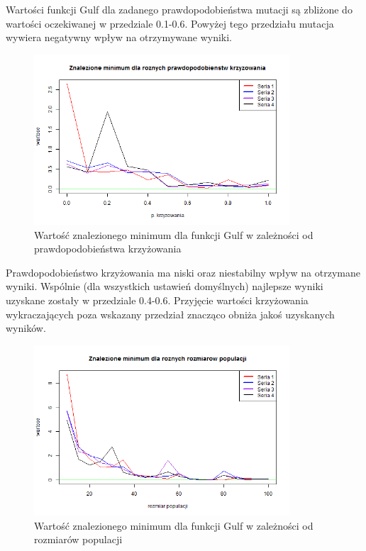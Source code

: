 \documentclass[11pt, a4paper]{article}
\newcommand{\fbi}{\leavevmode{\parindent=1em\indent}}
\begin{document}
\fbi
Wartości funkcji Gulf dla zadanego prawdopodobieństwa mutacji są zbliżone do wartości oczekiwanej w przedziale 0.1-0.6. Powyżej tego przedziału mutacja wywiera negatywny wpływ na otrzymywane wyniki.


\begin{figure}[H]
	\begin{center}
		\includegraphics[width=0.85\textwidth]{./assets/Gulf3.png}
		\caption{Wartość znalezionego minimum dla funkcji Gulf w zależności od prawdopodobieństwa krzyżowania}
		\label{fig:gulf3}
	\end{center}
\end{figure}

\fbi
Prawdopodobieństwo krzyżowania ma niski oraz niestabilny wpływ na otrzymane wyniki. Wspólnie (dla wszystkich ustawień domyślnych) najlepsze wyniki uzyskane zostały w przedziale 0.4-0.6. Przyjęcie wartości krzyżowania wykraczających poza wskazany przedział znacząco obniża jakoś uzyskanych wyników.

\begin{figure}[H]
	\begin{center}
		\includegraphics[width=0.85\textwidth]{./assets/Gulf4.png}
		\caption{Wartość znalezionego minimum dla funkcji Gulf w zależności od rozmiarów populacji}
		\label{fig:gulf4}
	\end{center}
\end{figure}
\end{document}
